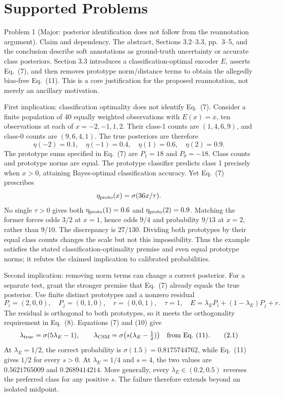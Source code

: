 \documentclass[10pt]{article}
\begin{document}
\section*{Supported Problems}
Problem 1 (Major: posterior identification does not follow from the reannotation argument).  Claim and dependency. The abstract, Sections 3.2–3.3, pp. 3–5, and the conclusion describe soft annotations as ground-truth uncertainty or accurate class posteriors. Section 3.3 introduces a classification-optimal encoder \(E\), asserts Eq. (7), and then removes prototype norm/distance terms to obtain the allegedly bias-free Eq. (11). This is a core justification for the proposed reannotation, not merely an ancillary motivation.\par
First implication: classification optimality does not identify Eq. (7). Consider a finite population of 40 equally weighted observations with \(E(x)=x\), ten observations at each of \(x=-2,-1,1,2\). Their class-1 counts are \((1,4,6,9)\), and class-0 counts are \((9,6,4,1)\). The true posteriors are therefore \[\eta(-2)=0.1,\quad\eta(-1)=0.4,\quad
 \eta(1)=0.6,\quad\eta(2)=0.9.\] The prototype sums specified in Eq. (7) are \(P_1=18\) and \(P_0=-18\). Class counts and prototype norms are equal. The prototype classifier predicts class 1 precisely when \(x>0\), attaining Bayes-optimal classification accuracy. Yet Eq. (7) prescribes \[\eta_{\rm proto}(x)=\sigma(36x/\tau).\] No single \(\tau>0\) gives both \(\eta_{\rm proto}(1)=0.6\) and \(\eta_{\rm proto}(2)=0.9\). Matching the former forces odds \(3/2\) at \(x=1\), hence odds \(9/4\) and probability \(9/13\) at \(x=2\), rather than \(9/10\). The discrepancy is \(27/130\). Dividing both prototypes by their equal class counts changes the scale but not this impossibility. Thus the example satisfies the stated classification-optimality premise and even equal prototype norms; it refutes the claimed implication to calibrated probabilities.\par
Second implication: removing norm terms can change a correct posterior. For a separate test, grant the stronger premise that Eq. (7) already equals the true posterior. Use finite distinct prototypes and a nonzero residual \[P_i=(2,0,0),\quad P_j=(0,1,0),\quad
 r=(0,0,1),\quad \tau=1,\quad
 E=\lambda_E P_i+(1-\lambda_E)P_j+r.\] The residual is orthogonal to both prototypes, so it meets the orthogonality requirement in Eq. (8). Equations (7) and (10) give \[\lambda_{\rm true}=\sigma(5\lambda_E-1),
 \qquad
 \lambda_{\rm CSM}=\sigma\bigl(s(\lambda_E-\tfrac12)\bigr)
 \quad\text{from Eq.~(11)}.
 \tag{2.1}\] At \(\lambda_E=1/2\), the correct probability is \(\sigma(1.5)=0.8175744762\), while Eq. (11) gives \(1/2\) for every \(s>0\). At \(\lambda_E=1/4\) and \(s=4\), the two values are \(0.5621765009\) and \(0.2689414214\). More generally, every \(\lambda_E\in(0.2,0.5)\) reverses the preferred class for any positive \(s\). The failure therefore extends beyond an isolated midpoint.\par
\end{document}
